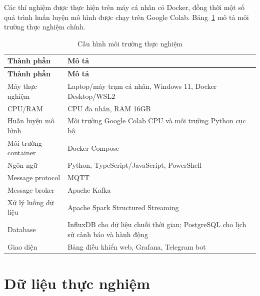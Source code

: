 Các thí nghiệm được thực hiện trên máy cá nhân có Docker, đồng thời một số quá trình huấn luyện mô hình được chạy trên Google Colab. Bảng~\ref{tab:env_hardware} mô tả môi trường thực nghiệm chính.

\begingroup
\small
\renewcommand{\arraystretch}{1.25}
\setlength{\LTleft}{0pt}
\setlength{\LTright}{0pt}

\begin{longtable}{
  >{\raggedright\arraybackslash}p{4cm}
  >{\raggedright\arraybackslash}p{\dimexpr\textwidth-4cm-4\tabcolsep\relax}
}
\caption{Cấu hình môi trường thực nghiệm}
\label{tab:env_hardware} \\
\toprule
\textbf{Thành phần} & \textbf{Mô tả} \\
\midrule
\endfirsthead
\toprule
\textbf{Thành phần} & \textbf{Mô tả} \\
\midrule
\endhead
\endfoot
\bottomrule
\endlastfoot

Máy thực nghiệm 
& Laptop/máy trạm cá nhân, Windows 11, Docker Desktop/WSL2 \\

CPU/RAM 
& CPU đa nhân, RAM 16GB \\

Huấn luyện mô hình 
& Môi trường Google Colab CPU và môi trường Python cục bộ \\

Môi trường container 
& Docker Compose \\

Ngôn ngữ 
& Python, TypeScript/JavaScript, PowerShell \\

Message protocol 
& MQTT \\

Message broker 
& Apache Kafka \\

Xử lý luồng dữ liệu 
& Apache Spark Structured Streaming \\

Database 
& InfluxDB cho dữ liệu chuỗi thời gian; PostgreSQL cho lịch sử cảnh báo và hành động \\

Giao diện 
& Bảng điều khiển web, Grafana, Telegram bot \\

\end{longtable}
\endgroup

\section{Dữ liệu thực nghiệm}
\label{sec:dataset_role}
